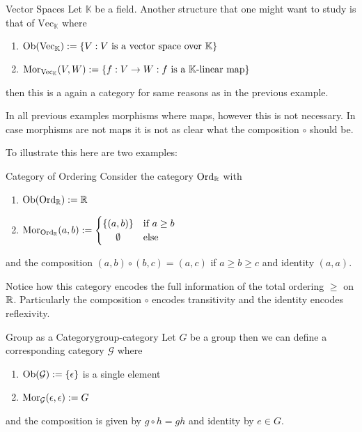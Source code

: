 \begin{example}{Vector Spaces}{}
Let $\mathbb{K}$ be a field. Another structure that one might want to study is that of $\mathrm{Vec}_\mathbb{K}$ where
\begin{enumerate}
    \item $\mathrm {Ob}(\mathrm{Vec}_\mathbb{K}) := \{V : \text{$V$ is a vector space over $\mathbb{K}$}\}$
    \item $\mathrm {Mor}_{\mathrm{Vec}_\mathbb{K}}(V,W) := \{f: V \to W : \text{$f$ is a $\mathbb{K}$-linear map}\}$
\end{enumerate}
then this is a again a category for same reasons as in the previous example.
\end{example}

In all previous examples morphisms where maps, however this is not necessary. In case morphisms are not maps it is not as clear what the composition $\circ$ should be.

To illustrate this here are two examples:

\begin{example}{Category of Ordering}{}
Consider the category $\mathrm{Ord}_\mathbb R$ with
\begin{enumerate}
    \item $\mathrm {Ob}(\mathrm{Ord}_\mathbb R) := \mathbb R$
    \item $\mor_{\mathrm{Ord}_\R}(a,b) := \begin{cases}
        \{(a,b)\} & \text{if $a \ge b$} \\
        \hfil \emptyset & \text{else}
    \end{cases}$
\end{enumerate}
and the composition $(a,b) \circ (b,c) = (a,c)$ if $a \ge b \ge c$ and identity $(a,a)$.

Notice how this category encodes the full information of the total ordering $\ge$ on $\mathbb R$. Particularly the composition $\circ$ encodes transitivity and the identity encodes reflexivity.
\end{example}

\begin{example}{Group as a Category}{group-category}
Let $G$ be a group then we can define a corresponding category $\mathcal{G}$ where
\begin{enumerate}
    \item $\mathrm {Ob}(\mathcal{G}) := \{\epsilon\}$ is a single element
    \item $\mathrm {Mor}_{\mathcal{G}}(\epsilon,\epsilon) := G$
\end{enumerate}
and the composition is given by $g \circ h = gh$ and identity by $e \in G$.
\end{example}

